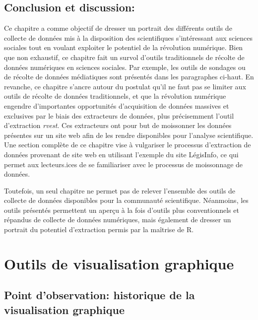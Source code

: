 \documentclass[
  letterpaper,
  DIV=11,
  numbers=noendperiod]{scrreprt}
\begin{document}
\section{Conclusion et discussion:}\label{conclusion-et-discussion}

Ce chapitre a comme objectif de dresser un portrait des différents
outils de collecte de données mis à la disposition des scientifiques
s'intéressant aux sciences sociales tout en voulant exploiter le
potentiel de la révolution numérique. Bien que non exhaustif, ce
chapitre fait un survol d'outils traditionnels de récolte de données
numériques en sciences sociales. Par exemple, les outils de sondages ou
de récolte de données médiatiques sont présentés dans les paragraphes
ci-haut. En revanche, ce chapitre s'ancre autour du postulat qu'il ne
faut pas se limiter aux outils de récolte de données traditionnels, et
que la révolution numérique engendre d'importantes opportunités
d'acquisition de données massives et exclusives par le biais des
extracteurs de données, plus précisemment l'outil d'extraction
\emph{rvest}. Ces extracteurs ont pour but de moissonner les données
présentes sur un site web afin de les rendre disponibles pour l'analyse
scientifique. Une section complète de ce chapitre vise à vulgariser le
processus d'extraction de données provenant de site web en utilisant
l'exemple du site LégisInfo, ce qui permet aux lecteurs.ices de se
familiariser avec le processus de moissonnage de données.

Toutefois, un seul chapitre ne permet pas de relever l'ensemble des
outils de collecte de données disponibles pour la communauté
scientifique. Néanmoins, les outils présentés permettent un aperçu à la
fois d'outils plus conventionnels et répandus de collecte de données
numériques, mais également de dresser un portrait du potentiel
d'extraction permis par la maîtrise de R.


\chapter{Outils de visualisation
graphique}\label{outils-de-visualisation-graphique}

\section{Point d'observation: historique de la visualisation
graphique}\label{point-dobservation-historique-de-la-visualisation-graphique}
\end{document}
